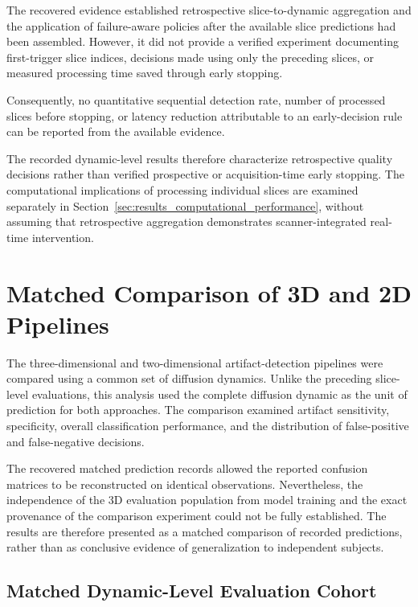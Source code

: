 The recovered evidence established retrospective slice-to-dynamic aggregation and the application of failure-aware policies after the available slice predictions had been assembled. However, it did not provide a verified experiment documenting first-trigger slice indices, decisions made using only the preceding slices, or measured processing time saved through early stopping.

Consequently, no quantitative sequential detection rate, number of processed slices before stopping, or latency reduction attributable to an early-decision rule can be reported from the available evidence.

The recorded dynamic-level results therefore characterize retrospective quality decisions rather than verified prospective or acquisition-time early stopping. The computational implications of processing individual slices are examined separately in Section~\ref{sec:results_computational_performance}, without assuming that retrospective aggregation demonstrates scanner-integrated real-time intervention.

\section{Matched Comparison of 3D and 2D Pipelines}
\label{sec:results_3d_vs_2d}

The three-dimensional and two-dimensional artifact-detection pipelines were compared using a common set of diffusion dynamics. Unlike the preceding slice-level evaluations, this analysis used the complete diffusion dynamic as the unit of prediction for both approaches. The comparison examined artifact sensitivity, specificity, overall classification performance, and the distribution of false-positive and false-negative decisions.

The recovered matched prediction records allowed the reported confusion matrices to be reconstructed on identical observations. Nevertheless, the independence of the 3D evaluation population from model training and the exact provenance of the comparison experiment could not be fully established. The results are therefore presented as a matched comparison of recorded predictions, rather than as conclusive evidence of generalization to independent subjects.

\subsection{Matched Dynamic-Level Evaluation Cohort}
\label{subsec:results_matched_dynamic_cohort}


